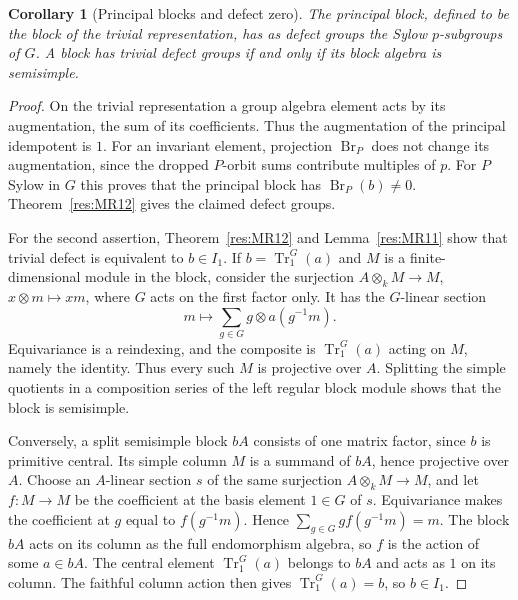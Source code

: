 \documentclass[11pt,oneside,openany]{book}
\newtheorem{corollary}[theorem]{Corollary}
\theoremstyle{definition}
\theoremstyle{remark}
\begin{document}
\begin{corollary}[Principal blocks and defect zero]
\label{res:MR13}
The principal block, defined to be the block of the trivial
representation, has as defect groups the Sylow \(p\)-subgroups
of \(G\). A block has trivial defect groups if and only if
its block algebra is semisimple.
\end{corollary}

\begin{proof}
On the trivial representation a group algebra element acts by
its augmentation, the sum of its coefficients. Thus the
augmentation of the principal idempotent is \(1\).
For an invariant element, projection \(\operatorname{Br}_P\)
does not change its augmentation, since the dropped
\(P\)-orbit sums contribute multiples of \(p\).
For \(P\) Sylow in \(G\) this proves that the principal block
has \(\operatorname{Br}_P(b)\ne0\).
Theorem~\ref{res:MR12} gives the claimed defect groups.

For the second assertion, Theorem~\ref{res:MR12} and
Lemma~\ref{res:MR11} show that trivial defect is equivalent
to \(b\in I_1\). If \(b=\operatorname{Tr}_1^G(a)\) and \(M\)
is a finite-dimensional module in the block, consider the
surjection \(A\otimes_k M\to M\), \(x\otimes m\mapsto xm\),
where \(G\) acts on the first factor only. It has the
\(G\)-linear section
\[
 m\longmapsto\sum_{g\in G} g\otimes a(g^{-1}m).
\]
Equivariance is a reindexing, and the composite is
\(\operatorname{Tr}_1^G(a)\) acting on \(M\), namely the
identity. Thus every such \(M\) is projective over \(A\).
Splitting the simple quotients in a composition series of the
left regular block module shows that the block is semisimple.

Conversely, a split semisimple block \(bA\) consists of one
matrix factor, since \(b\) is primitive central. Its simple
column \(M\) is a summand of \(bA\), hence projective over \(A\).
Choose an \(A\)-linear section \(s\) of the same surjection
\(A\otimes_k M\to M\), and let \(f:M\to M\) be the
coefficient at the basis element \(1\in G\) of \(s\).
Equivariance makes the coefficient at \(g\) equal to
\(f(g^{-1}m)\). Hence
\(\sum_{g\in G}g f(g^{-1}m)=m\). The block \(bA\) acts on
its column as the full endomorphism algebra, so \(f\) is
the action of some \(a\in bA\). The central element
\(\operatorname{Tr}_1^G(a)\) belongs to \(bA\) and acts as
\(1\) on its column. The faithful column action then gives
\(\operatorname{Tr}_1^G(a)=b\), so \(b\in I_1\).
\end{proof}
\end{document}
